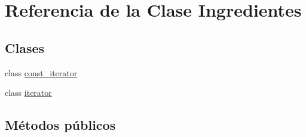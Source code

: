 \hypertarget{classIngredientes}{}\section{Referencia de la Clase Ingredientes}
\label{classIngredientes}
\subsection*{Clases}
\begin{DoxyCompactItemize}
\item 
class \hyperlink{classIngredientes_1_1const__iterator}{const\+\_\+iterator}
\item 
class \hyperlink{classIngredientes_1_1iterator}{iterator}
\end{DoxyCompactItemize}
\subsection*{Métodos públicos}
